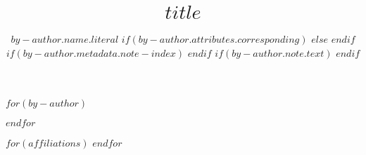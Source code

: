 \title{$title$}

$for(by-author)$
\author[$if(by-author.affiliations)$$for(by-author.affiliations)$$it.id$$sep$,$endfor$$endif$%
]{$by-author.name.literal$
$if(by-author.attributes.corresponding)$
$else$
$endif$
$if(by-author.metadata.note-index)$
$endif$
$if(by-author.note.text)$
$endif$
}
$endfor$

$for(affiliations)$
$endfor$

